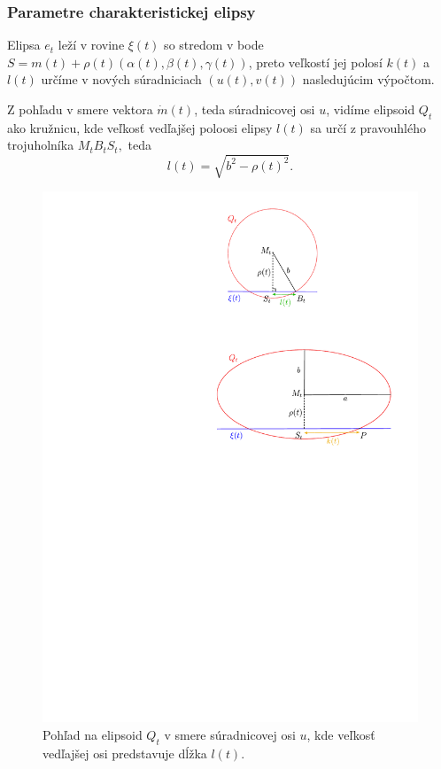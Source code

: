 \subsubsection{Parametre charakteristickej elipsy}
Elipsa $e_t$ leží v rovine $\xi(t) $ so stredom v bode $S = m(t) + \rho(t)(\alpha(t), \beta(t), \gamma(t))$, preto veľkostí jej polosí $k(t)$ a $l(t)$ určíme v nových súradniciach $(u(t),v(t))$ nasledujúcim výpočtom.

Z pohľadu v smere vektora $\dot{m}(t)$, teda súradnicovej osi $u$, vidíme elipsoid $Q_t$ ako kružnicu, kde veľkosť vedľajšej poloosi elipsy $l(t)$ sa určí z pravouhlého trojuholníka $M_tB_tS_t,$ teda
$$l(t) = \sqrt{b^2 - \rho(t)^2}.$$
\begin{figure}[H]
	\centering
	\includegraphics[trim={5cm 23cm 0 0.9cm},clip]{images/elipsa.pdf}
	\caption[Vedľajšia os charakteristickej elipsy.]{Pohľad na elipsoid $Q_t$ v smere súradnicovej osi $u$, kde veľkosť vedľajšej osi predstavuje dĺžka $l(t)$.}
	\label{fig:ellipse1}
\end{figure}
